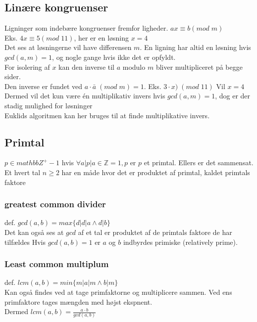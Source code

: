 \documentclass[12pt, a4paper]{article}
\begin{document}
			\subsection{Linære kongruenser}
				Ligninger som indebære kongruenser fremfor ligheder. $ax\equiv b (mod\; m)$\\
				Eks. $4x\equiv 5 (mod\; 11)$, her er en løsning $x=4$\\
				Det ses at løsningerne vil have differensen $m$.
				En ligning har altid en løsning hvis $gcd(a,m)=1$, og nogle gange hvis ikke det er opfyldt.\\
				For isolering af $x$ kan den inverse til $a$ modulo $m$ bliver multipliceret på begge sider.\\
				Den inverse er fundet ved $a\cdot \bar{a}\;(mod\;m)=1$. Eks. $3\cdot x)\;(mod\;11)$ Vil $x=4$\\
				Dermed vil det kun være én multiplikativ invers hvis $gcd(a,m)=1$, dog er der stadig mulighed for løsninger\\
				Euklids algoritmen kan her bruges til at finde multiplikative invers.\\
				
			\subsection{Primtal}
				$p\in mathbb{Z}^+-{1}$ hvis $\forall a|p | a\in \mathbb{Z} = {1,p}$ er $p$ et primtal. Ellers er det sammensat.\\
				Et hvert tal $n\geq 2$ har en måde hvor det er produktet af primtal, kaldet primtals faktore\\
			\subsubsection{greatest common divider}
				def. $gcd(a,b)=max\{d| d|a \land d|b\}$\\
				Det kan også ses at $gcd$ af et tal er produktet af de primtals faktore de har tilfældes
				Hvis $gcd(a,b)=1$ er $a$ og $b$ indbyrdes primiske (relatively prime).
			\subsubsection{Least common multiplum}
				def. $lcm(a,b)=min\{m| a|m \land b|m\}$\\
				Kan også findes ved at tage primfaktorne og multiplicere sammen. Ved ens primfaktore tages mængden med højst ekspnent.\\
				Dermed $lcm(a,b)=\frac{a\cdot b}{gcd(a,b)}$
\end{document}
